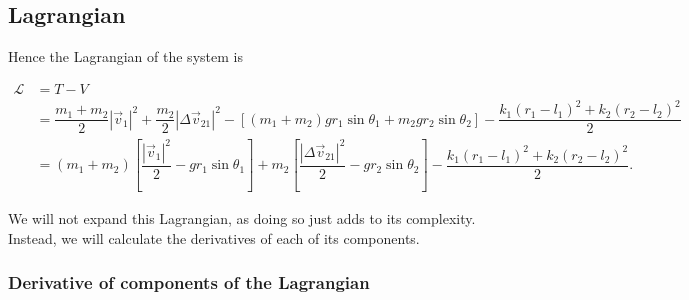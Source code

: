 \documentclass[12pt,a4paper,portrait]{article}
\newcommand{\lag}{\mathcal{L}}
\begin{document}
\begin{landscape}
\subsection{Lagrangian}
Hence the Lagrangian of the system is

\begin{align*}
	\lag &= T - V \\
	&= \dfrac{m_1+m_2}{2}|\vec{v}_1|^2 + \dfrac{m_2}{2}|\Delta \vec{v}_{21}|^2 - \left[(m_1+m_2)gr_1\sin{\theta_1} + m_2gr_2\sin{\theta_2}\right] - \dfrac{k_1(r_1-l_1)^2+k_2(r_2-l_2)^2}{2} \\
	&= (m_1+m_2)\left[\dfrac{|\vec{v}_1|^2}{2} - gr_1\sin{\theta_1}\right] + m_2\left[\dfrac{|\Delta \vec{v}_{21}|^2}{2} - gr_2\sin{\theta_2}\right]  - \dfrac{k_1(r_1-l_1)^2+k_2(r_2-l_2)^2}{2}.
\end{align*}

We will not expand this Lagrangian, as doing so just adds to its complexity. Instead, we will calculate the derivatives of each of its components. 

\subsubsection{Derivative of components of the Lagrangian}


\end{landscape}
\end{document}
